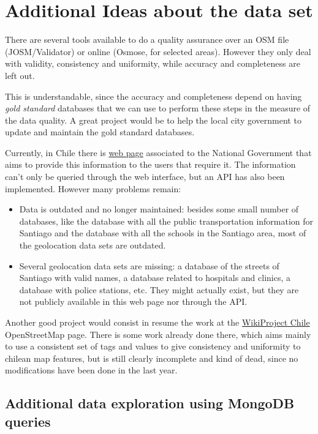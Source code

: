 \documentclass[a4paper,10pt,english]{sphinxhowto}
\begin{document}
\section{Additional Ideas about the data set}
\label{index:additional-ideas-about-the-data-set}
There are several tools available to do a quality assurance over an OSM file
(JOSM/Validator) or online (Osmose, for selected areas). However they only deal
with validity, consistency and uniformity, while accuracy and completeness are
left out.

This is understandable, since the accuracy and completeness depend on having
\emph{gold standard} databases that we can use to perform these steps in the measure
of the data quality. A great project would be to help the local city government
to update and maintain the gold standard databases.

Currently, in Chile there is \href{http://datos.gob.cl}{web page} associated to the
National Government that aims to provide this information to the users that
require it. The information can't only be queried through the web interface, but
an API has also been implemented. However many problems remain:
\begin{itemize}
\item {} 
Data is outdated and no longer maintained: besides some small number of
databases, like the database with all the public transportation information
for Santiago and the database with all the schools in the Santiago area, most
of the geolocation data sets are outdated.

\item {} 
Several geolocation data sets are missing: a database of the streets of Santiago
with valid names, a database related to hospitals and clinics, a database with
police stations, etc. They might actually exist, but they are not publicly
available in this web page nor through the API.

\end{itemize}

Another good project would consist in resume the work at the
\href{http://wiki.openstreetmap.org/wiki/WikiProject\_Chile}{WikiProject Chile}
OpenStreetMap page. There is some work already done there, which aims mainly to
use a consistent set of tags and values to give consistency and uniformity to
chilean map features, but is still clearly incomplete and kind of dead, since
no modifications have been done in the last year.


\subsection{Additional data exploration using MongoDB queries}
\label{index:additional-data-exploration-using-mongodb-queries}
\end{document}
